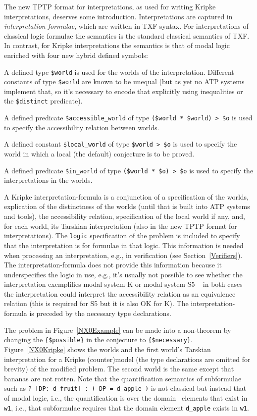 \documentclass{ceurart}
\newenvironment{packed_itemize}{
\vspace*{-0.3em}
\begin{itemize}
\setlength{\partopsep}{0pt}
\setlength{\itemsep}{1pt}
\setlength{\parskip}{0pt}
\setlength{\parsep}{0pt}
}{\end{itemize}}
\begin{document}
The new TPTP format for interpretations, as used for writing Kripke interpretations, deserves 
some introduction.
Interpretations are captured in {\em interpretation-formulae}, which are written in TXF syntax.
For interpretations of classical logic formulae the semantics is the standard classical semantics 
of TXF.
In contrast, for Kripke interpretations the semantics is that of modal logic enriched with four 
new hybrid defined symbols:
\begin{packed_itemize}
\item A defined type {\tt \$world} is used for the worlds of the interpretation.
      Different constants of type {\tt \$world} are known to be unequal (but as yet no ATP 
      systems implement that, so it's necessary to encode that explicitly using inequalities or 
      the {\tt \$distinct} predicate).
\item A defined predicate {\tt \$accessible\_world} of type {\tt (\$world\,*\,\$world)\,>\,\$o}
      is used to specify the accessibility relation between worlds.
\item A defined constant {\tt \$local\_world} of type {\tt \$world\,>\,\$o} is used to specify 
      the world in which a local (the default) conjecture is to be proved. 
\item A defined predicate {\tt \$in\_world} of type {\tt (\$world\,*\,\$o)\,>\,\$o} is used to 
      specify the interpretations in the worlds.
\end{packed_itemize}
A Kripke interpretation-formula is a conjunction of 
a specification of the worlds,
explication of the distinctness of the worlds (until that is built into ATP systems and tools),
the accessibility relation,
specification of the local world if any,
and,
for each world, its Tarskian interpretation (also in the new TPTP format for interpretations).
The {\tt logic} specification of the problem is included to specify that the interpretation is
for formulae in that logic.
This information is needed when processing an interpretation, e.g., in verification (see 
Section~\ref{Verifiers}). 
The interpretation-formula does not provide this information because it underspecifies the 
logic in use, e.g., it's usually not possible to see whether the interpretation exemplifies modal 
system K or modal system S5 -- in both cases the interpretation could interpret the accessibility 
relation as an equivalence relation (this is required for S5 but it is also OK for K).
The interpretation-formula is preceded by the necessary type declarations.

The problem in Figure~\ref{NX0Example} can be made into a non-theorem by changing the 
{\tt \{\$possible\}} in the conjecture to {\tt \{\$necessary\}}.
Figure~\ref{NX0Kripke} shows the worlds and the first world's Tarskian interpretation for 
a Kripke (counter)model (the type declarations are omitted for brevity) of the modified problem.
The second world is the same except that bananas are not rotten.
Note that the quantification semantics of subformulae such as 
{\tt ?\,[DP:\,d\_fruit]\,:\,(\,DP\,=\,d\_apple\,)}
is not classical but instead that of modal logic, i.e., the quantification is over the domain 
elements that exist in {\tt w1}, i.e., that subformulae requires that the domain element 
{\tt d\_apple} exists in {\tt w1}.
\end{document}
